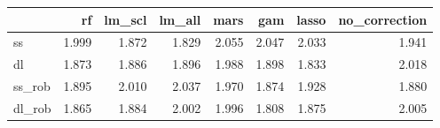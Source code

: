 \begin{tabular}{lrrrrrrr}
\toprule
 & rf & lm_scl & lm_all & mars & gam & lasso & no_correction \\
\midrule
ss & {\cellcolor[HTML]{3A3A3A}} \color[HTML]{F1F1F1} 1.999 & {\cellcolor[HTML]{C2C2C2}} \color[HTML]{000000} 1.872 & {\cellcolor[HTML]{F1F1F1}} \color[HTML]{000000} 1.829 & {\cellcolor[HTML]{000000}} \color[HTML]{F1F1F1} 2.055 & {\cellcolor[HTML]{080808}} \color[HTML]{F1F1F1} 2.047 & {\cellcolor[HTML]{171717}} \color[HTML]{F1F1F1} 2.033 & {\cellcolor[HTML]{7A7A7A}} \color[HTML]{F1F1F1} 1.941 \\
dl & {\cellcolor[HTML]{BDBDBD}} \color[HTML]{000000} 1.873 & {\cellcolor[HTML]{ABABAB}} \color[HTML]{F1F1F1} 1.886 & {\cellcolor[HTML]{9F9F9F}} \color[HTML]{F1F1F1} 1.896 & {\cellcolor[HTML]{272727}} \color[HTML]{F1F1F1} 1.988 & {\cellcolor[HTML]{9D9D9D}} \color[HTML]{F1F1F1} 1.898 & {\cellcolor[HTML]{F1F1F1}} \color[HTML]{000000} 1.833 & {\cellcolor[HTML]{000000}} \color[HTML]{F1F1F1} 2.018 \\
ss_rob & {\cellcolor[HTML]{D1D1D1}} \color[HTML]{000000} 1.895 & {\cellcolor[HTML]{272727}} \color[HTML]{F1F1F1} 2.010 & {\cellcolor[HTML]{000000}} \color[HTML]{F1F1F1} 2.037 & {\cellcolor[HTML]{626262}} \color[HTML]{F1F1F1} 1.970 & {\cellcolor[HTML]{F1F1F1}} \color[HTML]{000000} 1.874 & {\cellcolor[HTML]{A0A0A0}} \color[HTML]{F1F1F1} 1.928 & {\cellcolor[HTML]{E8E8E8}} \color[HTML]{000000} 1.880 \\
dl_rob & {\cellcolor[HTML]{ACACAC}} \color[HTML]{000000} 1.865 & {\cellcolor[HTML]{949494}} \color[HTML]{F1F1F1} 1.884 & {\cellcolor[HTML]{040404}} \color[HTML]{F1F1F1} 2.002 & {\cellcolor[HTML]{0B0B0B}} \color[HTML]{F1F1F1} 1.996 & {\cellcolor[HTML]{F1F1F1}} \color[HTML]{000000} 1.808 & {\cellcolor[HTML]{9F9F9F}} \color[HTML]{F1F1F1} 1.875 & {\cellcolor[HTML]{000000}} \color[HTML]{F1F1F1} 2.005 \\
\bottomrule
\end{tabular}
